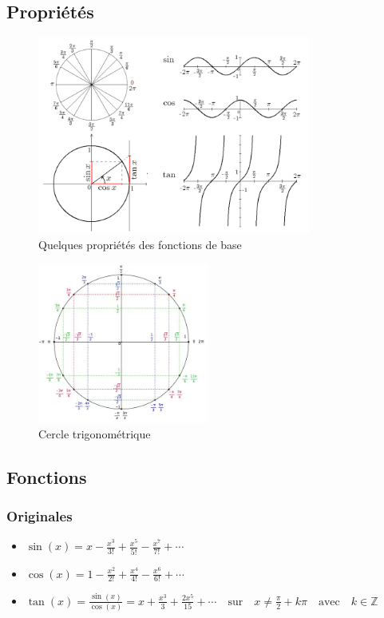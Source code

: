 \documentclass[12]{article}%
\theoremstyle{plain}
\theoremstyle{definition}
\theoremstyle{remark}
\begin{document}
\subsection{Propriétés}
\begin{figure}[h] %
	\centering
	\includegraphics[width=0.8\textwidth]{./images/trigonometrie.png} %
	\caption{Quelques propriétés des fonctions de base}
	\label{fig:trigonometrie} %
\end{figure}

\begin{figure}[h] %
	\centering
	\includegraphics[width=0.5\textwidth]{./images/cercle-trigonometrique.jpg} %
	\caption{Cercle trigonométrique}
	\label{fig:cercletrigo} %
\end{figure}
\newpage


\subsection{Fonctions}
\subsubsection{Originales}
\begin{itemize}
	\item \( \boxed{\sin(x) = x - \frac{x^3}{3!} + \frac{x^5}{5!} - \frac{x^7}{7!} + \cdots} \)
	\item \( \boxed{\cos(x) = 1 - \frac{x^2}{2!} + \frac{x^4}{4!} - \frac{x^6}{6!} + \cdots} \)
	\item \( \boxed{\tan(x) = \frac{\sin(x)}{\cos(x)} = x + \frac{x^3}{3} + \frac{2x^5}{15} + \cdots} \quad \text{sur} \quad x \neq \frac{\pi}{2} + k\pi \quad \text{avec} \quad k \in \mathbb{Z} \)
\end{itemize}
\end{document}
